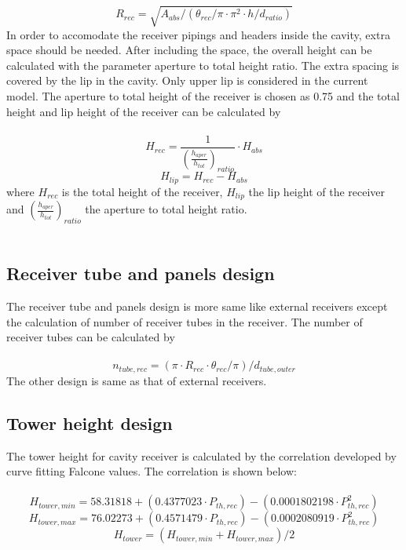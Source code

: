 \begin{equation}
	R_{rec} = \sqrt{A_{abs} / (\theta_{rec} / \pi \cdot \pi^2 \cdot h/d_{ratio})}
\end{equation}
In order to accomodate the receiver pipings and headers inside the cavity, extra space should be needed. After including the space, the overall height can be calculated with the parameter aperture to total height ratio. The extra spacing is covered by the lip in the cavity. Only upper lip is considered in the current model. The aperture to total height of the receiver is chosen as 0.75 and the total height and lip height of the receiver can be calculated by \\\\
\begin{equation}
	H_{rec} = \frac{1} {\left(\frac{h_{aper}}{h_{tot}}\right)_{ratio}} \cdot H_{abs}
\end{equation}
\begin{equation}
	H_{lip} = H_{rec} - H_{abs}
\end{equation}
where $H_{rec}$ is the total height of the receiver, $H_{lip}$ the lip height of the receiver and $\left(\frac{h_{aper}}{h_{tot}}\right)_{ratio}$ the aperture to total height ratio.\\\\
\subsection{Receiver tube and panels design}
The receiver tube and panels design is more same like external receivers except the calculation of number of receiver tubes in the receiver. The number of receiver tubes can be calculated by\\\\
\begin{equation}
n_{tube,rec} = (\pi \cdot R_{rec} \cdot \theta_{rec} / \pi) / d_{tube,outer}
\end{equation}
The other design is same as that of external receivers. 
\subsection{Tower height design}
The tower height for cavity receiver is calculated by the correlation developed by curve fitting Falcone values. The correlation is shown below:\\\\
\begin{equation}
	H_{tower,min} = 58.31818 + (0.4377023 \cdot P_{th,rec}) - (0.0001802198 \cdot P_{th,rec}^2)
\end{equation}        
\begin{equation}
	H_{tower,max}= 76.02273 + (0.4571479 \cdot P_{th,rec}) - (0.0002080919 \cdot P_{th,rec}^2)
\end{equation}
\begin{equation}
	H_{tower} = (H_{tower,min} + H_{tower,max}) / 2
\end{equation}
